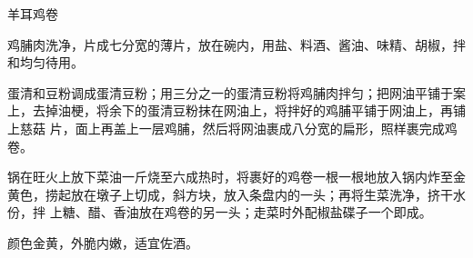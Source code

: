 %
%
%
%
%
%
%
\begin{recipe}{羊耳鸡卷}

\ingredients


\preparation

\step 鸡脯肉洗净，片成七分宽的薄片，放在碗内，用盐、料酒、酱油、味精、胡椒，拌
和均匀待用。

\step 蛋清和豆粉调成蛋清豆粉；用三分之一的蛋清豆粉将鸡脯肉拌匀；把网油平铺于案
上，去掉油梗，将余下的蛋清豆粉抹在网油上，将拌好的鸡脯平铺于网油上，再铺上慈菇
片，面上再盖上一层鸡脯，然后将网油裹成八分宽的扁形，照样裹完成鸡卷。

\step 锅在旺火上放下菜油一斤烧至六成热时，将裹好的鸡卷一根一根地放入锅内炸至金
黄色，捞起放在墩子上切成，斜方块，放入条盘内的一头；再将生菜洗净，挤干水份，拌
上糖、醋、香油放在鸡卷的另一头；走菜时外配椒盐碟子一个即成。

\features

颜色金黄，外脆内嫩，适宜佐酒。

\end{recipe}

